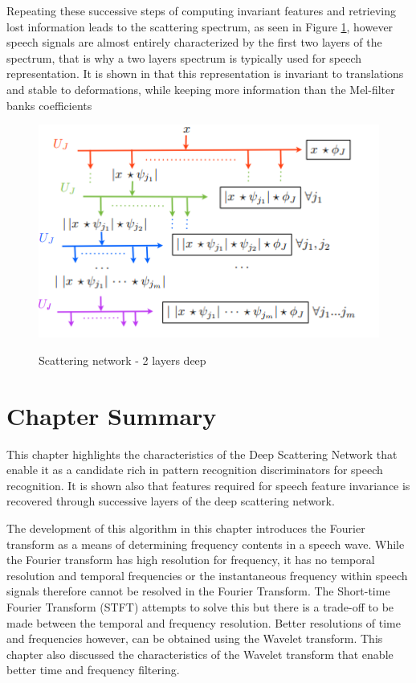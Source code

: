 Repeating these successive steps of computing invariant features and retrieving lost information leads to the scattering spectrum, as seen in Figure \ref{fig_4_3_scatter}, however speech signals are almost entirely characterized by the first two layers of the spectrum, that is why a two layers spectrum is typically used for speech representation. It is shown in \citep{anden2014deep} that this representation is invariant to translations and stable to deformations, while keeping more information than the Mel-filter banks coefficients
\begin{figure}
\centering
  \includegraphics[width=14cm]{thesis/images/scatter.png}\\
  \caption{Scattering network - 2 layers deep} \cite{zeghidour2016deep}\label{fig_4_3_scatter}
\end{figure}

\section{Chapter Summary}
This chapter highlights the characteristics of the Deep Scattering Network that enable it as a candidate rich in pattern recognition discriminators for speech recognition. It is shown also that features required for speech feature invariance is recovered through successive layers of the deep scattering network.  

The development of this algorithm in this chapter introduces the Fourier transform as a means of determining frequency contents in a speech wave.  While the Fourier transform has high resolution for frequency, it has no temporal resolution and temporal frequencies or the instantaneous frequency within speech signals therefore cannot be resolved in the Fourier Transform.   The Short-time Fourier Transform (STFT) attempts to solve this but there is a trade-off to be made between the temporal and frequency resolution.  Better resolutions of time and frequencies however, can be obtained using the Wavelet transform.  This chapter also discussed the characteristics of the Wavelet transform that enable better time and frequency filtering.

